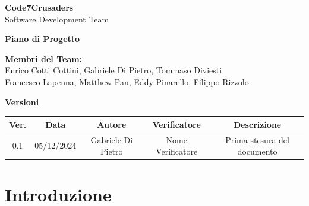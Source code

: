 \documentclass{article}
\begin{document}
\begin{titlepage}
    {\Huge \textbf{Code7Crusaders}}\\
    \vspace{0.5cm}
    {\Large Software Development Team}\\
    \vspace{2cm}
    
    {\large \textbf{Piano di Progetto}}\\
    \vspace{5cm}
    
    
    \textbf{Membri del Team:}\\
    Enrico Cotti Cottini, Gabriele Di Pietro, Tommaso Diviesti \\
    Francesco Lapenna, Matthew Pan, Eddy Pinarello, Filippo Rizzolo \\
    \vspace{0.5cm}
    
    \vspace{1cm}
\end{titlepage}



\newpage
\begin{table}[h!]
\centering
\textbf{Versioni} \\ %
\vspace{2mm} %
\begin{tabular}{|c|c|c|c|c|}
    \hline
    \textbf{Ver.} & \textbf{Data} & \textbf{Autore} & \textbf{Verificatore} & \textbf{Descrizione} \\
    \hline
    0.1 & 05/12/2024 & Gabriele Di Pietro & Nome Verificatore & Prima stesura del documento \\  
    \hline
\end{tabular}
\end{table}



\newpage
\tableofcontents



\newpage
\section{Introduzione}
\end{document}
